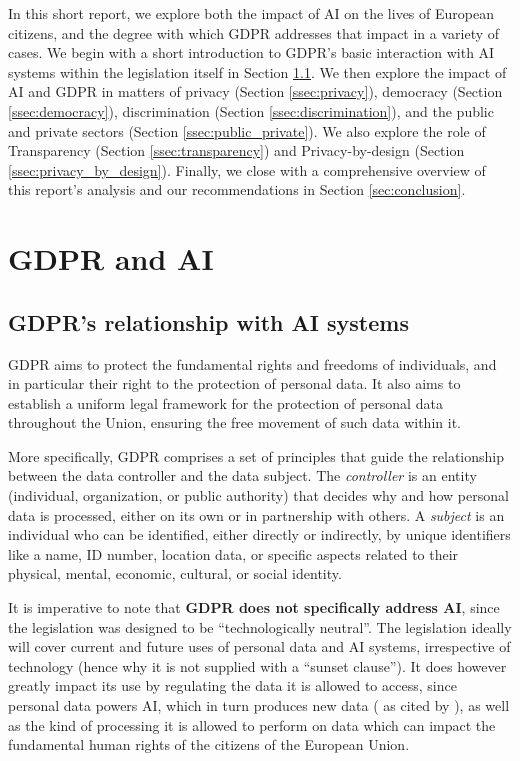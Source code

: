 \documentclass{article}
\begin{document}
In this short report, we explore both the impact of AI on the lives of European citizens, and the degree with which GDPR addresses that impact in a variety of cases. We begin with a short introduction to GDPR's basic interaction with AI systems within the legislation itself in Section \ref{ssec:gdpr_ai}. We then explore the impact of AI and GDPR in matters of privacy (Section \ref{ssec:privacy}), democracy (Section \ref{ssec:democracy}), discrimination (Section \ref{ssec:discrimination}), and the public and private sectors (Section \ref{ssec:public_private}). We also explore the role of Transparency (Section \ref{ssec:transparency}) and Privacy-by-design (Section \ref{ssec:privacy_by_design}). Finally, we close with a comprehensive overview of this report's analysis and our recommendations in Section \ref{sec:conclusion}.

\section{GDPR and AI}

\subsection{GDPR's relationship with AI systems}
\label{ssec:gdpr_ai}

GDPR aims to protect the fundamental rights and freedoms of individuals, and in particular their right to the protection of personal data. It also aims to establish a uniform legal framework for the protection of personal data throughout the Union, ensuring the free movement of such data within it.

More specifically, GDPR comprises a set of principles that guide the relationship between the data controller and the data subject. The \emph{controller} is an entity (individual, organization, or public authority) that decides why and how personal data is processed, either on its own or in partnership with others. A \emph{subject} is an individual who can be identified, either directly or indirectly, by unique identifiers like a name, ID number, location data, or specific aspects related to their physical, mental, economic, cultural, or social identity. 

It is imperative to note that \textbf{GDPR does not specifically address AI}, since the legislation was designed to be “technologically neutral”. The legislation ideally will cover current and future uses of personal data and AI systems, irrespective of technology (hence why it is not supplied with a “sunset clause”). It does however greatly impact its use by regulating the data it is allowed to access, since personal data powers AI, which in turn produces new data (\cite{coe2018report, buttarelli2016privacy} as cited by \cite{mitrou}), as well as the kind of processing it is allowed to perform on data which can impact the fundamental human rights of the citizens of the European Union.
\end{document}
